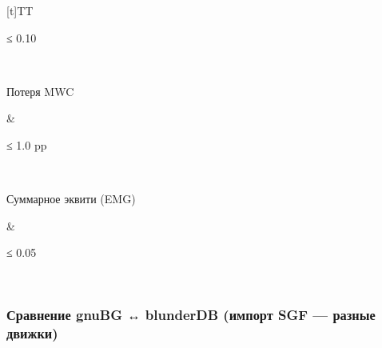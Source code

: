 \documentclass[letterpaper,10pt,russian]{sphinxmanual}
\begin{document}
\begin{savenotes}
\begin{tabulary}{\linewidth}[t]{TT}
\begin{varwidth}[t]{}
\sphinxAtStartPar
≤ 0.10
\sphinxbeforeendvarwidth
\end{varwidth}%
\\
\sphinxhline\begin{varwidth}[t]{}
\sphinxAtStartPar
Потеря MWC
\sphinxbeforeendvarwidth
\end{varwidth}%
&\begin{varwidth}[t]{}
\sphinxAtStartPar
≤ 1.0 pp
\sphinxbeforeendvarwidth
\end{varwidth}%
\\
\sphinxhline\begin{varwidth}[t]{}
\sphinxAtStartPar
Суммарное эквити (EMG)
\sphinxbeforeendvarwidth
\end{varwidth}%
&\begin{varwidth}[t]{}
\sphinxAtStartPar
≤ 0.05
\sphinxbeforeendvarwidth
\end{varwidth}%
\\
\sphinxbottomrule
\end{tabulary}
\sphinxtableafterendhook\par
\sphinxattableend\end{savenotes}


\subsubsection{Сравнение gnuBG ↔ blunderDB (импорт SGF — разные движки)}
\label{\detokenize{stats_parity:comparaison-gnubg-blunderdb-import-sgf-moteurs-differents}}
\end{document}
